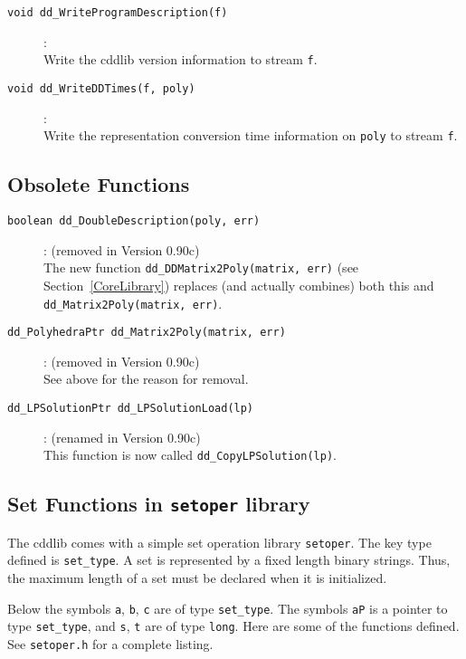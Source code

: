 \documentclass[11pt]{article}
\newcommand {\0} {{\bf 0}}
\begin{document}
\begin{description}
\item[{\tt void dd\_WriteProgramDescription(f)}]:\\
Write the cddlib version information to stream {\tt f}.

\item[{\tt void dd\_WriteDDTimes(f, poly)}]:\\
Write the representation conversion time information on {\tt poly}
 to stream {\tt f}.

\end{description}

\subsection{Obsolete Functions}  \label{ObsoleteFunctions}
\begin{description}
\item[{\tt boolean dd\_DoubleDescription(poly, err)}]: 
(removed in Version 0.90c)\\
The new function
{\tt dd\_DDMatrix2Poly(matrix, err)} (see Section~\ref{CoreLibrary}) 
replaces (and actually combines) both this and 
{\tt dd\_Matrix2Poly(matrix, err)}.

\item[{\tt dd\_PolyhedraPtr dd\_Matrix2Poly(matrix, err)}]: 
(removed in Version 0.90c)\\
See above for the reason for removal.

\item[{\tt dd\_LPSolutionPtr dd\_LPSolutionLoad(lp)}]:
(renamed in Version 0.90c)\\
This function is now called {\tt dd\_CopyLPSolution(lp)}.

\end{description}


\subsection{Set Functions in {\tt setoper} library}  \label{SetFunctions}

The cddlib comes with a simple set operation library {\tt setoper}.  The key
type defined is {\tt set\_type}.   A set is represented by a fixed length
binary strings.  Thus, the maximum length of a set must be declared when
it is initialized.

Below the symbols {\tt a},   {\tt b},  {\tt c} are
of type  {\tt set\_type}.   The symbols {\tt aP} is a
pointer to type  {\tt set\_type}, and {\tt s}, {\tt t} are of type {\tt long}.
Here are some of the functions defined.  See {\tt setoper.h} for a
complete listing.
\end{document}
